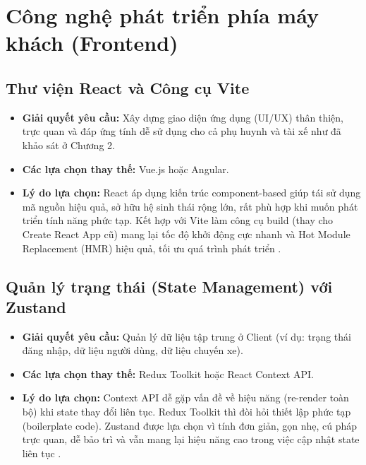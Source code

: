 \documentclass[../DoAn.tex]{subfiles}
\begin{document}
\section{Công nghệ phát triển phía máy khách (Frontend)}

\subsection{Thư viện React và Công cụ Vite}
\begin{itemize}
    \item \textbf{Giải quyết yêu cầu:} Xây dựng giao diện ứng dụng (UI/UX) thân thiện, trực quan và đáp ứng tính dễ sử dụng cho cả phụ huynh và tài xế như đã khảo sát ở Chương 2.
    \item \textbf{Các lựa chọn thay thế:} Vue.js hoặc Angular.
    \item \textbf{Lý do lựa chọn:} React áp dụng kiến trúc component-based giúp tái sử dụng mã nguồn hiệu quả, sở hữu hệ sinh thái rộng lớn, rất phù hợp khi muốn phát triển tính năng phức tạp. Kết hợp với Vite làm công cụ build (thay cho Create React App cũ) mang lại tốc độ khởi động cực nhanh và Hot Module Replacement (HMR) hiệu quả, tối ưu quá trình phát triển \cite{React_Reference,Vite_Reference}.
\end{itemize}

\subsection{Quản lý trạng thái (State Management) với Zustand}
\begin{itemize}
    \item \textbf{Giải quyết yêu cầu:} Quản lý dữ liệu tập trung ở Client (ví dụ: trạng thái đăng nhập, dữ liệu người dùng, dữ liệu chuyến xe).
    \item \textbf{Các lựa chọn thay thế:} Redux Toolkit hoặc React Context API.
    \item \textbf{Lý do lựa chọn:} Context API dễ gặp vấn đề về hiệu năng (re-render toàn bộ) khi state thay đổi liên tục. Redux Toolkit thì đòi hỏi thiết lập phức tạp (boilerplate code). Zustand được lựa chọn vì tính đơn giản, gọn nhẹ, cú pháp trực quan, dễ bảo trì và vẫn mang lại hiệu năng cao trong việc cập nhật state liên tục \cite{Zustand_Reference}.
\end{itemize}
\end{document}

